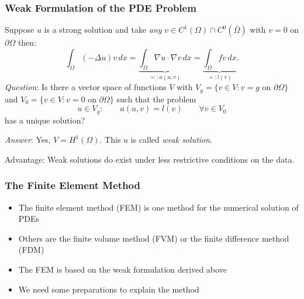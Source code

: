 \documentclass[ignorenonframetext,11pt]{beamer}
\theoremstyle{definition}
\begin{document}
\begin{frame}
\frametitle{Weak Formulation of the PDE Problem}

Suppose $u$ is a strong solution and take  {\em any }
$v\in C^1(\Omega)\cap C^0(\bar\Omega)$ with $v=0$ on $\partial\Omega$ then:
\begin{equation*}
\int_\Omega (-\Delta u) v \,dx = 
\underbrace{\int_\Omega \nabla u \cdot \nabla v \,dx}_{=: a(u,v)}= 
\underbrace{\int_\Omega fv \,dx}_{=: l(v)}.
\end{equation*}
{\em Question}:  Is there a vector space of functions $V$ with $V_g=\{v\in V : 
\text{$v=g$ on $\partial\Omega$}\}$ and $V_0=\{v\in V : 
\text{$v=0$ on $\partial\Omega$}\}$ such that
the problem
\begin{equation}
u \in V_g :\qquad a(u,v) = l(v) \qquad \forall v\in V_0 \label{eq:weakform}
\end{equation}
has a unique solution?

{\em Answer}: Yes, $V=H^1(\Omega)$. This $u$ is called {\em weak solution}.

Advantage: Weak solutions do exist under less restrictive conditions on the data.
\end{frame}

\begin{frame}
\frametitle{The Finite Element Method}
\begin{itemize}
\item The finite element method (FEM) is one method for the numerical solution of 
PDEs
\item Others are the finite volume method (FVM) or the finite difference method (FDM)
\item The FEM is based on the weak formulation derived above
\item We need some preparations to explain the method
\end{itemize}
\end{frame}
\end{document}
